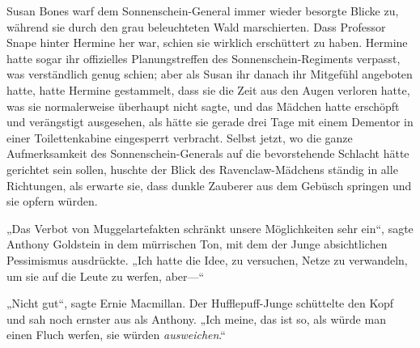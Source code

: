 Susan Bones warf dem Sonnenschein-General immer wieder besorgte Blicke zu, während sie durch den grau beleuchteten Wald marschierten. Dass Professor Snape hinter Hermine her war, schien sie wirklich erschüttert zu haben. Hermine hatte sogar ihr offizielles Planungstreffen des Sonnenschein-Regiments verpasst, was verständlich genug schien; aber als Susan ihr danach ihr Mitgefühl angeboten hatte, hatte Hermine gestammelt, dass sie die Zeit aus den Augen verloren hatte, was sie normalerweise überhaupt nicht sagte, und das Mädchen hatte erschöpft und verängstigt ausgesehen, als hätte sie gerade drei Tage mit einem Dementor in einer Toilettenkabine eingesperrt verbracht. Selbst jetzt, wo die ganze Aufmerksamkeit des Sonnenschein-Generals auf die bevorstehende Schlacht hätte gerichtet sein sollen, huschte der Blick des Ravenclaw-Mädchens ständig in alle Richtungen, als erwarte sie, dass dunkle Zauberer aus dem Gebüsch springen und sie opfern würden.

„Das Verbot von Muggelartefakten schränkt unsere Möglichkeiten sehr ein“, sagte Anthony Goldstein in dem mürrischen Ton, mit dem der Junge absichtlichen Pessimismus ausdrückte. „Ich hatte die Idee, zu versuchen, Netze zu verwandeln, um sie auf die Leute zu werfen, aber—“

„Nicht gut“, sagte Ernie Macmillan. Der Hufflepuff-Junge schüttelte den Kopf und sah noch ernster aus als Anthony. „Ich meine, das ist so, als würde man einen Fluch werfen, sie würden \emph{ausweichen}.“

